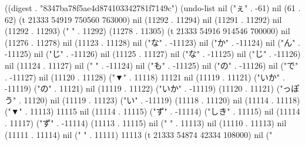 
((digest . "8347ba78f5ae4d874103342781f7149c") (undo-list nil ("ぇ" . -61) nil (61 . 62) (t 21333 54919 750560 763000) nil (11292 . 11294) nil (11291 . 11292) nil (11292 . 11293) ("  " . 11292) (11278 . 11305) (t 21333 54916 914546 700000) nil (11276 . 11278) nil (11123 . 11128) nil ("な" . -11123) nil ("か" . -11124) nil ("ん" . -11125) nil ("じ" . -11126) nil (11125 . 11127) nil ("な" . -11125) nil ("じ" . -11126) nil (11124 . 11127) nil (" " . -11124) nil ("も" . -11125) nil ("の" . -11126) nil ("で" . -11127) nil (11120 . 11128) ("▼" . 11118) 11121 nil (11119 . 11121) ("いか" . -11119) ("の" . 11121) nil (11119 . 11122) ("いか" . -11119) (11120 . 11121) ("っぽう" . 11120) nil (11119 . 11123) ("い" . -11119) (11118 . 11120) nil (11114 . 11118) ("▼" . 11113) 11115 nil (11114 . 11115) ("ず" . -11114) ("しき" . 11115) nil (11114 . 11117) ("ず" . -11114) (11113 . 11115) nil ("
" . 11113) nil (11110 . 11113) nil (11111 . 11114) nil ("  " . 11111) 11113 (t 21333 54874 42334 108000) nil ("
